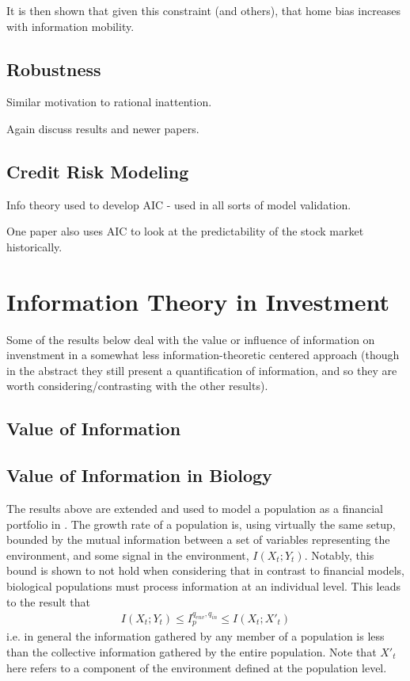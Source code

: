\documentclass[10pt, twocolumn]{IEEEtran}
\begin{document}
It is then shown that given this constraint (and others), that home bias increases with information mobility.

\subsection{Robustness}
Similar motivation to rational inattention.

Again discuss results and newer papers.
\subsection{Credit Risk Modeling}
Info theory used to develop AIC - used in all sorts of model validation.

One paper also uses AIC to look at the predictability of the stock market historically.
\section{Information Theory in Investment}
Some of the results below deal with the value or influence of information on invenstment in a
somewhat less information-theoretic centered approach (though in the abstract they still present
a quantification of information, and so they are worth considering/contrasting with the other
results).
\subsection{Value of Information}

\subsection{Value of Information in Biology}
The results above are extended and used to model a population as a financial portfolio in \cite{Rivoire2011}.
The growth rate of a population is, using virtually the same setup, bounded by the mutual information between
a set of variables representing the environment, and some signal in the environment,  $I(X_{t};Y_{t})$.
Notably, this bound is shown to not hold when considering that in contrast to financial models, biological populations
must process information at an individual level. This leads to the result that
\begin{gather*}
  I(X_{t};Y_{t}) \le I_{p}^{q_{env},q_{in}} \le I(X_{t};X'_{t})
\end{gather*}
i.e. in general the information gathered by any member of a population is less than the collective information
gathered by the entire population. Note that $X'_{t}$ here refers to a component of the environment defined at the population level.
\end{document}

